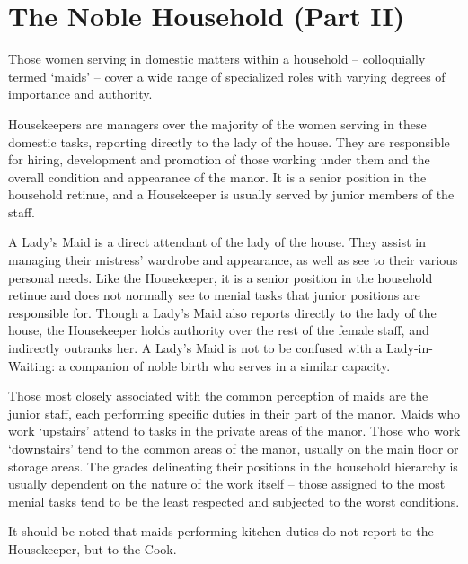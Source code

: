 \section*{The Noble Household (Part II)}

Those women serving in domestic matters within a household – colloquially termed ‘maids’ – cover a wide range of specialized roles with varying degrees of importance and authority.

 

Housekeepers are managers over the majority of the women serving in these domestic tasks, reporting directly to the lady of the house. They are responsible for hiring, development and promotion of those working under them and the overall condition and appearance of the manor. It is a senior position in the household retinue, and a Housekeeper is usually served by junior members of the staff.

 

A Lady’s Maid is a direct attendant of the lady of the house. They assist in managing their mistress’ wardrobe and appearance, as well as see to their various personal needs. Like the Housekeeper, it is a senior position in the household retinue and does not normally see to menial tasks that junior positions are responsible for. Though a Lady’s Maid also reports directly to the lady of the house, the Housekeeper holds authority over the rest of the female staff, and indirectly outranks her. A Lady’s Maid is not to be confused with a Lady-in-Waiting: a companion of noble birth who serves in a similar capacity.

 

Those most closely associated with the common perception of maids are the junior staff, each performing specific duties in their part of the manor. Maids who work ‘upstairs’ attend to tasks in the private areas of the manor. Those who work ‘downstairs’ tend to the common areas of the manor, usually on the main floor or storage areas. The grades delineating their positions in the household hierarchy is usually dependent on the nature of the work itself – those assigned to the most menial tasks tend to be the least respected and subjected to the worst conditions.

 

It should be noted that maids performing kitchen duties do not report to the Housekeeper, but to the Cook.
